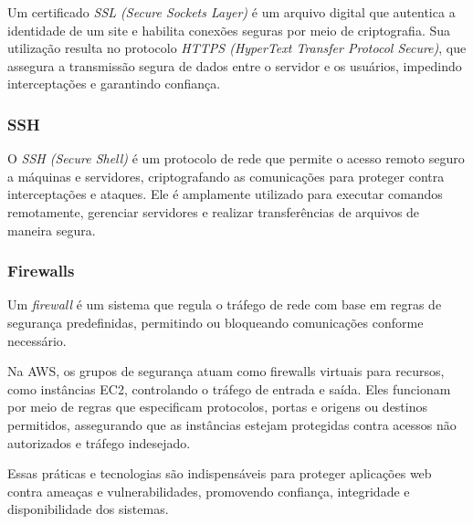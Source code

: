 
Um certificado \emph{SSL (Secure Sockets Layer)} é um arquivo digital que autentica a identidade de um site e habilita conexões seguras por meio de criptografia. Sua utilização resulta no protocolo \emph{HTTPS (HyperText Transfer Protocol Secure)}, que assegura a transmissão segura de dados entre o servidor e os usuários, impedindo interceptações e garantindo confiança.

\subsubsection{SSH}


O \emph{SSH (Secure Shell)} é um protocolo de rede que permite o acesso remoto seguro a máquinas e servidores, criptografando as comunicações para proteger contra interceptações e ataques. Ele é amplamente utilizado para executar comandos remotamente, gerenciar servidores e realizar transferências de arquivos de maneira segura.

\subsubsection{Firewalls}


Um \emph{firewall} é um sistema que regula o tráfego de rede com base em regras de segurança predefinidas, permitindo ou bloqueando comunicações conforme necessário.

Na AWS, os grupos de segurança atuam como firewalls virtuais para recursos, como instâncias EC2, controlando o tráfego de entrada e saída. Eles funcionam por meio de regras que especificam protocolos, portas e origens ou destinos permitidos, assegurando que as instâncias estejam protegidas contra acessos não autorizados e tráfego indesejado.

Essas práticas e tecnologias são indispensáveis para proteger aplicações web contra ameaças e vulnerabilidades, promovendo confiança, integridade e disponibilidade dos sistemas.









